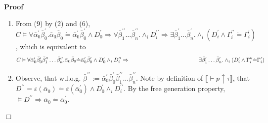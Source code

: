 \documentclass{article}
\newcommand{\assign}{:=}
\newenvironment{proof}{\noindent\textbf{Proof\ }}{\hspace*{\fill}$\Box$\medskip}
\begin{document}
\begin{proof}
\begin{itemize}
\begin{enumerate}
      \item From (9) by (2) and (6), $C \vDash \forall \bar{\alpha}_0^{\prime}
      \bar{\beta}_0^{\prime} . \bar{\alpha}_0 \bar{\beta}_0 \dot{=}
      \bar{\alpha}_0^{\prime} \bar{\beta}_0^{\prime} \wedge D_0^{\prime}
      \Rightarrow \forall \bar{\beta}_1^{\prime\prime} \ldots
      \bar{\beta}_n^{\prime\prime} . \wedge_i D_i^{\prime\prime} \Rightarrow
      \exists \bar{\beta}_1^{\prime} \ldots \bar{\beta}_n^{\prime} . \wedge_i
      (D_i^{\prime} \wedge \Gamma_i^{\prime\prime} \dot{=}
      \Gamma_i^{\prime})$, which is equivalent to
      \[ C \vDash \forall \bar{\alpha}_0^{\prime} \bar{\beta}_0^{\prime}
         \bar{\beta}_1^{\prime\prime} \ldots \bar{\beta}_n^{\prime\prime} .
         \bar{\alpha}_0 \bar{\beta}_0 \dot{=} \bar{\alpha}_0^{\prime}
         \bar{\beta}_0^{\prime} \wedge D_0^{\prime} \wedge_i
         D_i^{\prime\prime} \Rightarrow \text{ \ \ \ \ \ \ \ \ \ \ \ \ \ \ \ }
         \text{\\
         \ \ \ \ \ \ \ \ \ \ \ \ \ \ \ \ \ \ \ \ \ } \exists
         \bar{\beta}_1^{\prime} \ldots \bar{\beta}_n^{\prime} . \wedge_i
         \left( D_i^{\prime} \wedge {\nobreak} \Gamma_i^{\prime\prime} \dot{=}
         \Gamma_i^{\prime} \right) \]
      \item Observe, that w.l.o.g. $\bar{\beta}^{\prime\prime} \assign
      \bar{\alpha}_0^{\prime} \bar{\beta}_0^{\prime}
      \bar{\beta}_1^{\prime\prime} \ldots \bar{\beta}_n^{\prime\prime}$. Note
      by definition of $\llbracket \vdash p \uparrow \tau \rrbracket$, that
      $D^{\prime\prime} = \varepsilon (\bar{\alpha}_0) \dot{=} \varepsilon
      (\bar{\alpha}_0^{\prime}) \wedge D_0^{\prime} \wedge_i
      D_i^{\prime\prime}$. By the free generation property, $\vDash
      D^{\prime\prime} \Rightarrow \bar{\alpha}_0 \dot{=}
      \bar{\alpha}_0^{\prime}$.
      

\end{enumerate}
\end{itemize}
\end{proof}
\end{document}

